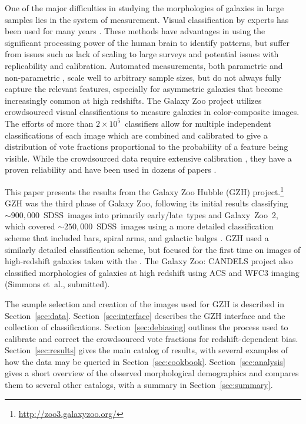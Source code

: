\documentclass[twocolumn]{aastex6}
\begin{document}
One of the major difficulties in studying the morphologies of galaxies in large samples lies in the system of measurement. Visual classification by experts has been used for many years \citep[eg,][]{hub26,dev59,san61,van76,nai10,bai11,kar15}. These methods have advantages in using the significant processing power of the human brain to identify patterns, but suffer from issues such as lack of scaling to large surveys and potential issues with replicability and calibration. Automated measurements, both parametric \citep{pen02a,sim11,lac12} and non-parametric \citep{abr03,con03,lot04,sca07,bam08,fre13}, scale well to arbitrary sample sizes, but do not always fully capture the relevant features, especially for asymmetric galaxies that become increasingly common at high redshifts. The Galaxy Zoo project \citep{lin08,lin11} utilizes crowdsourced visual classifications to measure galaxies in color-composite images. The efforts of more than $2\times10^5$~classifiers allow for multiple independent classifications of each image which are combined and calibrated to give a distribution of vote fractions proportional to the probability of a feature being visible. While the crowdsourced data require extensive calibration \citep{bam09,wil13}, they have a proven reliability and have been used in dozens of papers \citep[eg,][]{lan08,bam09,dar10,mas11c,ski12,sim13,sch14,wil15}. 

This paper presents the results from the Galaxy Zoo Hubble (GZH) project.\footnote{\url{http://zoo3.galaxyzoo.org/}} GZH was the third phase of Galaxy Zoo, following its initial results classifying $\sim900,000$~SDSS~images into primarily early/late~types \citep{lin11} and Galaxy~Zoo~2, which covered $\sim250,000$~SDSS~images using a more detailed classification scheme that included bars, spiral arms, and galactic bulges \citep{wil13}. GZH used a similarly detailed classification scheme, but focused for the first time on images of high-redshift galaxies taken with the \hubble. The Galaxy Zoo: CANDELS project also classified morphologies of galaxies at high redshift using ACS and WFC3 imaging (Simmons et~al., submitted).

The sample selection and creation of the images used for GZH is described in Section~\ref{sec:data}. Section~\ref{sec:interface} describes the GZH interface and the collection of classifications. Section~\ref{sec:debiasing} outlines the process used to calibrate and correct the crowdsourced vote fractions for redshift-dependent bias. Section~\ref{sec:results} gives the main catalog of results, with several examples of how the data may be queried in Section~\ref{sec:cookbook}. Section~\ref{sec:analysis} gives a short overview of the observed morphological demographics and compares them to several other catalogs, with a summary in Section~\ref{sec:summary}.
\end{document}
